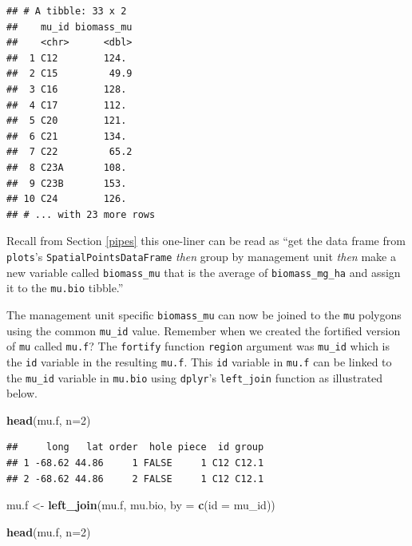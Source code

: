 \documentclass[
]{krantz}
\newenvironment{Shaded}{\begin{snugshade}}{\end{snugshade}}
\newcommand{\DataTypeTok}[1]{\textcolor[rgb]{0.13,0.29,0.53}{#1}}
\newcommand{\DecValTok}[1]{\textcolor[rgb]{0.00,0.00,0.81}{#1}}
\newcommand{\KeywordTok}[1]{\textcolor[rgb]{0.13,0.29,0.53}{\textbf{#1}}}
\newcommand{\NormalTok}[1]{#1}
\newcommand{\StringTok}[1]{\textcolor[rgb]{0.31,0.60,0.02}{#1}}
\begin{document}
\begin{verbatim}
## # A tibble: 33 x 2
##    mu_id biomass_mu
##    <chr>      <dbl>
##  1 C12        124. 
##  2 C15         49.9
##  3 C16        128. 
##  4 C17        112. 
##  5 C20        121. 
##  6 C21        134. 
##  7 C22         65.2
##  8 C23A       108. 
##  9 C23B       153. 
## 10 C24        126. 
## # ... with 23 more rows
\end{verbatim}

Recall from Section \ref{pipes} this one-liner can be read as ``get the data frame from \texttt{plots}'s \texttt{SpatialPointsDataFrame} \emph{then} group by management unit \emph{then} make a new variable called \texttt{biomass\_mu} that is the average of \texttt{biomass\_mg\_ha} and assign it to the \texttt{mu.bio} tibble.''

The management unit specific \texttt{biomass\_mu} can now be joined to the \texttt{mu} polygons using the common \texttt{mu\_id} value. Remember when we created the fortified version of \texttt{mu} called \texttt{mu.f}? The \texttt{fortify} function \texttt{region} argument was \texttt{mu\_id} which is the \texttt{id} variable in the resulting \texttt{mu.f}. This \texttt{id} variable in \texttt{mu.f} can be linked to the \texttt{mu\_id} variable in \texttt{mu.bio} using \texttt{dplyr}'s \texttt{left\_join} function as illustrated below.

\begin{Shaded}
\begin{Highlighting}[]
\KeywordTok{head}\NormalTok{(mu.f, }\DataTypeTok{n=}\DecValTok{2}\NormalTok{)}
\end{Highlighting}
\end{Shaded}

\begin{verbatim}
##     long   lat order  hole piece  id group
## 1 -68.62 44.86     1 FALSE     1 C12 C12.1
## 2 -68.62 44.86     2 FALSE     1 C12 C12.1
\end{verbatim}

\begin{Shaded}
\begin{Highlighting}[]
\NormalTok{mu.f \textless{}{-}}\StringTok{ }\KeywordTok{left\_join}\NormalTok{(mu.f, mu.bio, }\DataTypeTok{by =} \KeywordTok{c}\NormalTok{(}\StringTok{\textquotesingle{}id\textquotesingle{}}\NormalTok{ =}\StringTok{ \textquotesingle{}mu\_id\textquotesingle{}}\NormalTok{))}

\KeywordTok{head}\NormalTok{(mu.f, }\DataTypeTok{n=}\DecValTok{2}\NormalTok{)}
\end{Highlighting}
\end{Shaded}
\end{document}
